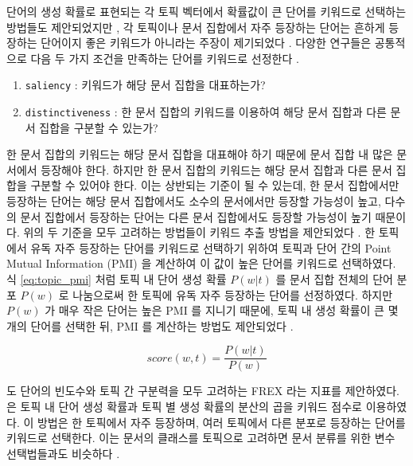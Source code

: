 \documentclass[11pt]{article}
\begin{document}
단어의 생성 확률로 표현되는 각 토픽 벡터에서 확률값이 큰 단어를 키워드로 선택하는 방법들도 제안되었지만 \citep{snyder2013topic, chuang2013topic, wallach2009evaluation}, 각 토픽이나 문서 집합에서 자주 등장하는 단어는 흔하게 등장하는 단어이지 좋은 키워드가 아니라는 주장이 제기되었다 \citep{ramage09tmsocial, newman2010evaluating, chuang2012interpretation}.
다양한 연구들은 공통적으로 다음 두 가지 조건을 만족하는 단어를 키워드로 선정한다 \citep{chuang2012termite}.

\begin{enumerate}[noitemsep]
  \item \texttt{saliency} : 키워드가 해당 문서 집합을 대표하는가?
  \item \texttt{distinctiveness} : 한 문서 집합의 키워드를 이용하여 해당 문서 집합과 다른 문서 집합을 구분할 수 있는가?
\end{enumerate}

한 문서 집합의 키워드는 해당 문서 집합을 대표해야 하기 때문에 문서 집합 내 많은 문서에서 등장해야 한다.
하지만 한 문서 집합의 키워드는 해당 문서 집합과 다른 문서 집합을 구분할 수 있어야 한다.
이는 상반되는 기준이 될 수 있는데, 한 문서 집합에서만 등장하는 단어는 해당 문서 집합에서도 소수의 문서에서만 등장할 가능성이 높고, 다수의 문서 집합에서 등장하는 단어는 다른 문서 집합에서도 등장할 가능성이 높기 때문이다.
위의 두 기준을 모두 고려하는 방법들이 키워드 추출 방법을 제안되었다 \citep{bischof2012summarizing, newman2010evaluating, taddy2012estimation}.
한 토픽에서 유독 자주 등장하는 단어를 키워드로 선택하기 위하여 \citep{newman2010evaluating, taddy2012estimation, mimno2011optimizing} 토픽과 단어 간의 Point Mutual Information (PMI) 을 계산하여 이 값이 높은 단어를 키워드로 선택하였다.
식 \ref{eq:topic_pmi} 처럼 토픽 내 단어 생성 확률 $P(w \vert t)$ 를 문서 집합 전체의 단어 분포 $P(w)$ 로 나눔으로써 한 토픽에 유독 자주 등장하는 단어를 선정하였다.
하지만 $P(w)$ 가 매우 작은 단어는 높은 PMI 를 지니기 때문에, 토픽 내 생성 확률이 큰 몇 개의 단어를 선택한 뒤, PMI 를 계산하는 방법도 제안되었다 \citep{newman2010evaluating, alsumait2009topic}.

\begin{equation}
  \label{eq:topic_pmi}
  score(w,t) = \frac{P(w \vert t)}{P(w)}
\end{equation}

\citep{bischof2012summarizing} 도 단어의 빈도수와 토픽 간 구분력을 모두 고려하는 FREX 라는 지표를 제안하였다.
\citep{song2009topic} 은 토픽 내 단어 생성 확률과 토픽 별 생성 확률의 분산의 곱을 키워드 점수로 이용하였다.
이 방법은 한 토픽에서 자주 등장하며, 여러 토픽에서 다른 분포로 등장하는 단어를 키워드로 선택한다.
이는 문서의 클래스를 토픽으로 고려하면 문서 분류를 위한 변수 선택법들과도 비슷하다 \citep{largeron2011entropy, popescul2000automatic}.
\end{document}
